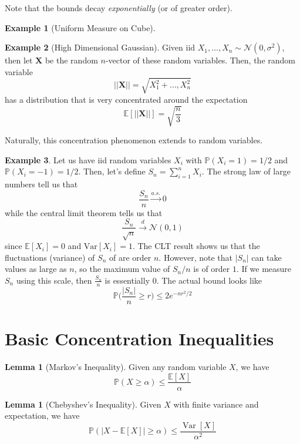 \documentclass{article}
\DeclareMathOperator{\Var}{Var}
\theoremstyle{definition}
\newtheorem{lemma}[theorem]{Lemma}
\newtheorem{example}{Example}[section]
\theoremstyle{remark}
\theoremstyle{definition}
\begin{document}
Note that the bounds decay \textit{exponentially} (or of greater order). 

\begin{example}[Uniform Measure on Cube]

\end{example}

\begin{example}[High Dimensional Gaussian]
Given iid $X_1, \ldots, X_n \sim \mathcal{N}(0, \sigma^2)$, then let $\mathbf{X}$ be the random $n$-vector of these random variables. Then, the random variable 
\[||\mathbf{X}|| = \sqrt{X_1^2 + \ldots, X_n^2}\]
has a distribution that is very concentrated around the expectation 
\[\mathbb{E}[||\mathbf{X}||] = \sqrt{\frac{n}{3}}\]
\end{example}

Naturally, this concentration phenomenon extends to random variables. 

\begin{example}
Let us have iid random variables $X_i$ with $\mathbb{P}(X_i = 1) = 1/2$ and $\mathbb{P}(X_i = -1) = 1/2$. Then, let's define $S_n = \sum_{i=1}^n X_i$. The strong law of large numbers tell us that 
\[\frac{S_n}{n} \xrightarrow{a.s.} 0\]
while the central limit theorem tells us that 
\[\frac{S_n}{\sqrt{n}} \xrightarrow{d} \mathcal{N}(0, 1)\]
since $\mathbb{E}[X_i] = 0$ and $\mathrm{Var}[X_i] = 1$. The CLT result shows us that the fluctuations (variance) of $S_n$ of are order $n$. However, note that $|S_n|$ can take values as large as $n$, so the maximum value of $S_n / n$ is of order $1$. If we measure $S_n$ using this scale, then $\frac{S_n}{n}$ is essentially $0$. The actual bound looks like 
\[\mathbb{P} \bigg( \frac{|S_n|}{n} \geq r \bigg) \leq 2 e^{-n r^2 / 2}\]
\end{example}

\section{Basic Concentration Inequalities}

\begin{lemma}[Markov's Inequality]
Given any random variable $X$, we have 
\[\mathbb{P}(X \geq \alpha) \leq \frac{\mathbb{E}[X]}{\alpha}\]
\end{lemma}

\begin{lemma}[Chebyshev's Inequality]
Given $X$ with finite variance and expectation, we have 
\[\mathbb{P}(|X - \mathbb{E}[X]| \geq \alpha) \leq \frac{\Var[X]}{\alpha^2}\]
\end{lemma}
\end{document}
